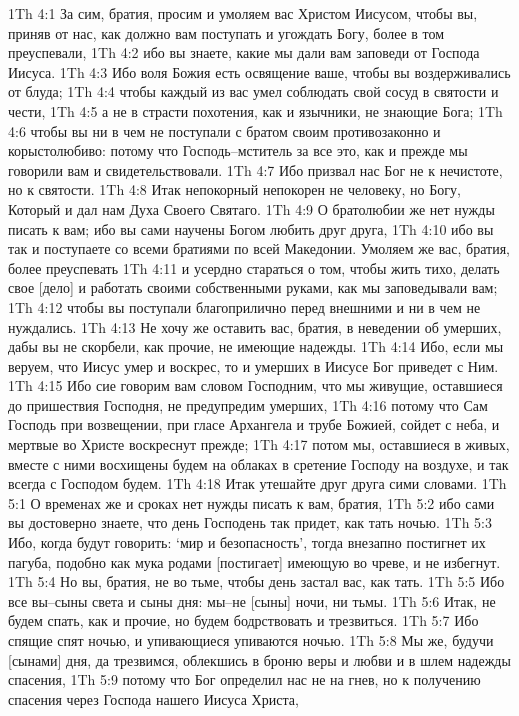 1Th 4:1  За сим, братия, просим и умоляем вас Христом Иисусом, чтобы вы, приняв от нас, как должно вам поступать и угождать Богу, более в том преуспевали,
1Th 4:2  ибо вы знаете, какие мы дали вам заповеди от Господа Иисуса.
1Th 4:3  Ибо воля Божия есть освящение ваше, чтобы вы воздерживались от блуда;
1Th 4:4  чтобы каждый из вас умел соблюдать свой сосуд в святости и чести,
1Th 4:5  а не в страсти похотения, как и язычники, не знающие Бога;
1Th 4:6  чтобы вы ни в чем не поступали с братом своим противозаконно и корыстолюбиво: потому что Господь--мститель за все это, как и прежде мы говорили вам и свидетельствовали.
1Th 4:7  Ибо призвал нас Бог не к нечистоте, но к святости.
1Th 4:8  Итак непокорный непокорен не человеку, но Богу, Который и дал нам Духа Своего Святаго.
1Th 4:9  О братолюбии же нет нужды писать к вам; ибо вы сами научены Богом любить друг друга,
1Th 4:10  ибо вы так и поступаете со всеми братиями по всей Македонии. Умоляем же вас, братия, более преуспевать
1Th 4:11  и усердно стараться о том, чтобы жить тихо, делать свое [дело] и работать своими собственными руками, как мы заповедывали вам;
1Th 4:12  чтобы вы поступали благоприлично перед внешними и ни в чем не нуждались.
1Th 4:13  Не хочу же оставить вас, братия, в неведении об умерших, дабы вы не скорбели, как прочие, не имеющие надежды.
1Th 4:14  Ибо, если мы веруем, что Иисус умер и воскрес, то и умерших в Иисусе Бог приведет с Ним.
1Th 4:15  Ибо сие говорим вам словом Господним, что мы живущие, оставшиеся до пришествия Господня, не предупредим умерших,
1Th 4:16  потому что Сам Господь при возвещении, при гласе Архангела и трубе Божией, сойдет с неба, и мертвые во Христе воскреснут прежде;
1Th 4:17  потом мы, оставшиеся в живых, вместе с ними восхищены будем на облаках в сретение Господу на воздухе, и так всегда с Господом будем.
1Th 4:18  Итак утешайте друг друга сими словами.
1Th 5:1  О временах же и сроках нет нужды писать к вам, братия,
1Th 5:2  ибо сами вы достоверно знаете, что день Господень так придет, как тать ночью.
1Th 5:3  Ибо, когда будут говорить: `мир и безопасность', тогда внезапно постигнет их пагуба, подобно как мука родами [постигает] имеющую во чреве, и не избегнут.
1Th 5:4  Но вы, братия, не во тьме, чтобы день застал вас, как тать.
1Th 5:5  Ибо все вы--сыны света и сыны дня: мы--не [сыны] ночи, ни тьмы.
1Th 5:6  Итак, не будем спать, как и прочие, но будем бодрствовать и трезвиться.
1Th 5:7  Ибо спящие спят ночью, и упивающиеся упиваются ночью.
1Th 5:8  Мы же, будучи [сынами] дня, да трезвимся, облекшись в броню веры и любви и в шлем надежды спасения,
1Th 5:9  потому что Бог определил нас не на гнев, но к получению спасения через Господа нашего Иисуса Христа,
